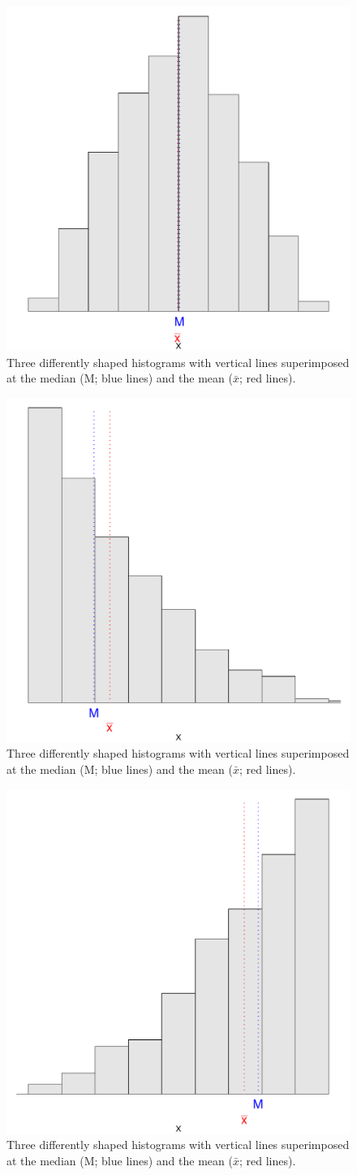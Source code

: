 \begin{knitrout}
\color{fgcolor}\begin{figure}
\includegraphics[width=.3\linewidth]{figure/MeanMedianShape-1} \caption[Three differently shaped histograms with vertical lines superimposed at the median (M]{Three differently shaped histograms with vertical lines superimposed at the median (M; blue lines) and the mean ($\bar{x}$; red lines).}\label{fig:MeanMedianShape1}
\end{figure}

\begin{figure}
\includegraphics[width=.3\linewidth]{figure/MeanMedianShape-2} \caption[Three differently shaped histograms with vertical lines superimposed at the median (M]{Three differently shaped histograms with vertical lines superimposed at the median (M; blue lines) and the mean ($\bar{x}$; red lines).}\label{fig:MeanMedianShape2}
\end{figure}

\begin{figure}
\includegraphics[width=.3\linewidth]{figure/MeanMedianShape-3} \caption[Three differently shaped histograms with vertical lines superimposed at the median (M]{Three differently shaped histograms with vertical lines superimposed at the median (M; blue lines) and the mean ($\bar{x}$; red lines).}\label{fig:MeanMedianShape3}
\end{figure}


\end{knitrout}


